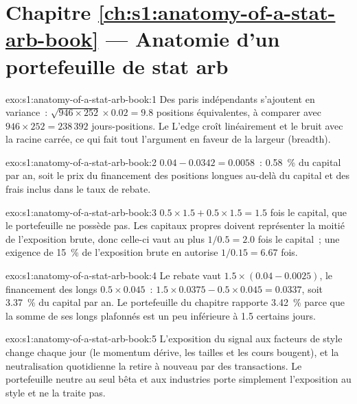 \section*{Chapitre \ref{ch:s1:anatomy-of-a-stat-arb-book} --- Anatomie d'un portefeuille de stat arb}

\begin{solution}{exo:s1:anatomy-of-a-stat-arb-book:1}
Des paris indépendants s'ajoutent en variance~: $\sqrt{946 \times 252} \times 0.02 = 9.8$ positions équivalentes, à comparer avec $946 \times 252 = 238\,392$ jours-positions. Le
L'edge croît linéairement et le bruit avec la racine carrée, ce qui fait tout l'argument en faveur de la largeur (breadth).
\end{solution}

\begin{solution}{exo:s1:anatomy-of-a-stat-arb-book:2}
$0.04 - 0.0342 = 0.0058$~: 0.58~\% du capital par an, soit le prix du financement des positions longues au-delà du capital et des frais inclus dans le taux de rebate.
\end{solution}

\begin{solution}{exo:s1:anatomy-of-a-stat-arb-book:3}
$0.5 \times 1.5 + 0.5 \times 1.5 = 1.5$ fois le capital, que le portefeuille ne possède pas. Les capitaux propres doivent représenter la moitié de l'exposition brute, donc celle-ci vaut au plus $1/0.5 = 2.0$ fois
le capital~; une exigence de 15~\% de l'exposition brute en autorise $1/0.15 = 6.67$ fois.
\end{solution}

\begin{solution}{exo:s1:anatomy-of-a-stat-arb-book:4}
Le rebate vaut $1.5 \times (0.04 - 0.0025)$, le financement des longs $0.5 \times 0.045$~: $1.5 \times 0.0375 - 0.5 \times 0.045 = 0.0337$, soit 3.37~\% du capital par
an. Le portefeuille du chapitre rapporte 3.42~\% parce que la somme de ses longs plafonnés est un peu inférieure à 1.5 certains jours.
\end{solution}

\begin{solution}{exo:s1:anatomy-of-a-stat-arb-book:5}
L'exposition du signal aux facteurs de style change chaque jour (le momentum dérive, les tailles et les cours bougent), et la neutralisation quotidienne la retire à nouveau par des transactions. Le
portefeuille neutre au seul bêta et aux industries porte simplement l'exposition au style et ne la traite pas.
\end{solution}

